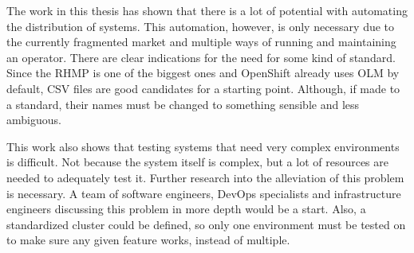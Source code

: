 The work in this thesis has shown that there is a lot of potential with automating the distribution of systems.
This automation, however, is only necessary due to the currently fragmented market and multiple ways of running and maintaining an operator.
There are clear indications for the need for some kind of standard.
Since the RHMP is one of the biggest ones and OpenShift already uses OLM by default, CSV files are good candidates for a starting point.
Although, if made to a standard, their names must be changed to something sensible and less ambiguous.

This work also shows that testing systems that need very complex environments is difficult.
Not because the system itself is complex, but a lot of resources are needed to adequately test it.
Further research into the alleviation of this problem is necessary.
A team of software engineers, DevOps specialists and infrastructure engineers discussing this problem in more depth would be a start.
Also, a standardized cluster could be defined, so only one environment must be tested on to make sure any given feature works, instead of multiple.

